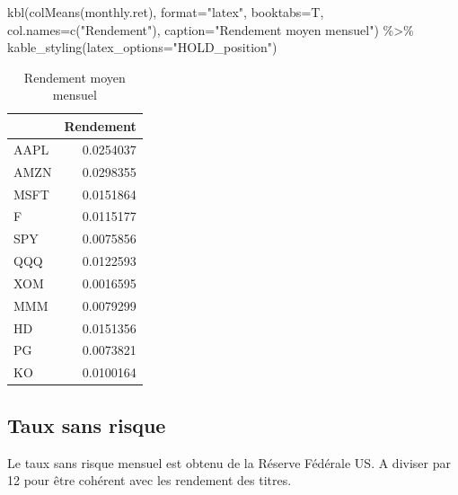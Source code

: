 \documentclass[
]{article}
\newenvironment{Shaded}{\begin{snugshade}}{\end{snugshade}}
\newcommand{\AttributeTok}[1]{\textcolor[rgb]{0.77,0.63,0.00}{#1}}
\newcommand{\FunctionTok}[1]{\textcolor[rgb]{0.00,0.00,0.00}{#1}}
\newcommand{\NormalTok}[1]{#1}
\newcommand{\SpecialCharTok}[1]{\textcolor[rgb]{0.00,0.00,0.00}{#1}}
\newcommand{\StringTok}[1]{\textcolor[rgb]{0.31,0.60,0.02}{#1}}
\begin{document}
\begin{Shaded}
\begin{Highlighting}[]
\FunctionTok{kbl}\NormalTok{(}\FunctionTok{colMeans}\NormalTok{(monthly.ret), }\AttributeTok{format=}\StringTok{"latex"}\NormalTok{, }\AttributeTok{booktabs=}\NormalTok{T,}
    \AttributeTok{col.names=}\FunctionTok{c}\NormalTok{(}\StringTok{"Rendement"}\NormalTok{), }\AttributeTok{caption=}\StringTok{"Rendement moyen mensuel"}\NormalTok{) }\SpecialCharTok{\%\textgreater{}\%}
    \FunctionTok{kable\_styling}\NormalTok{(}\AttributeTok{latex\_options=}\StringTok{"HOLD\_position"}\NormalTok{)}
\end{Highlighting}
\end{Shaded}

\begin{table}[H]

\caption{\label{tab:unnamed-chunk-3}Rendement moyen mensuel}
\centering
\begin{tabular}[t]{lr}
\toprule
  & Rendement\\
\midrule
AAPL & 0.0254037\\
AMZN & 0.0298355\\
MSFT & 0.0151864\\
F & 0.0115177\\
SPY & 0.0075856\\
\addlinespace
QQQ & 0.0122593\\
XOM & 0.0016595\\
MMM & 0.0079299\\
HD & 0.0151356\\
PG & 0.0073821\\
\addlinespace
KO & 0.0100164\\
\bottomrule
\end{tabular}
\end{table}

\hypertarget{taux-sans-risque}{%
\subsection{Taux sans risque}\label{taux-sans-risque}}

Le taux sans risque mensuel est obtenu de la Réserve Fédérale US. A
diviser par 12 pour être cohérent avec les rendement des titres.
\end{document}
